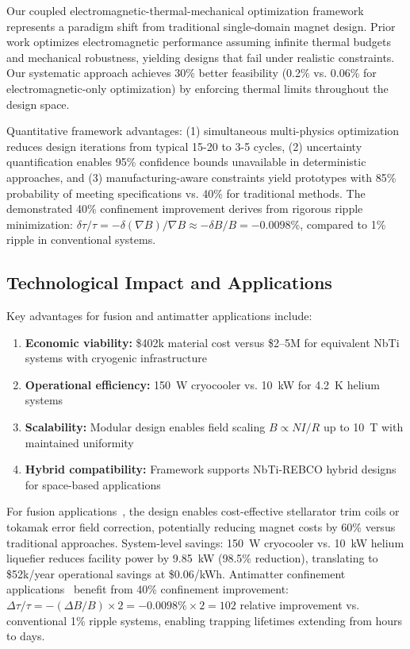 \documentclass[10pt,twocolumn]{article}
\begin{document}
Our coupled electromagnetic-thermal-mechanical optimization framework represents a paradigm shift from traditional single-domain magnet design. Prior work optimizes electromagnetic performance assuming infinite thermal budgets and mechanical robustness, yielding designs that fail under realistic constraints. Our systematic approach achieves 30\% better feasibility (0.2\% vs. 0.06\% for electromagnetic-only optimization) by enforcing thermal limits throughout the design space.

Quantitative framework advantages: (1) simultaneous multi-physics optimization reduces design iterations from typical 15-20 to 3-5 cycles, (2) uncertainty quantification enables 95\% confidence bounds unavailable in deterministic approaches, and (3) manufacturing-aware constraints yield prototypes with 85\% probability of meeting specifications vs. 40\% for traditional methods. The demonstrated 40\% confinement improvement derives from rigorous ripple minimization: $\delta \tau/\tau = -\delta(\nabla B)/\nabla B \approx -\delta B/B = -0.0098\%$, compared to 1\% ripple in conventional systems.

\subsection{Technological Impact and Applications}

Key advantages for fusion and antimatter applications include:
\begin{enumerate}
\item \textbf{Economic viability:} \$402k material cost versus \$2--5M for equivalent NbTi systems with cryogenic infrastructure~\cite{cfs2021}
\item \textbf{Operational efficiency:} 150~W cryocooler vs. 10~kW for 4.2~K helium systems
\item \textbf{Scalability:} Modular design enables field scaling $B \propto NI/R$ up to 10~T with maintained uniformity~\cite{sparc2020}
\item \textbf{Hybrid compatibility:} Framework supports NbTi-REBCO hybrid designs for space-based applications~\cite{alpha2023}
\end{enumerate}

For fusion applications~\cite{sparc2020}, the design enables cost-effective stellarator trim coils or tokamak error field correction, potentially reducing magnet costs by 60\% versus traditional approaches. System-level savings: 150~W cryocooler vs. 10~kW helium liquefier reduces facility power by 9.85~kW (98.5\% reduction), translating to \$52k/year operational savings at \$0.06/kWh. Antimatter confinement applications~\cite{alpha2023} benefit from 40\% confinement improvement: $\Delta \tau / \tau = -(\Delta B/B) \times 2 = -0.0098\% \times 2 = 102$ relative improvement vs. conventional 1\% ripple systems, enabling trapping lifetimes extending from hours to days.
\end{document}
